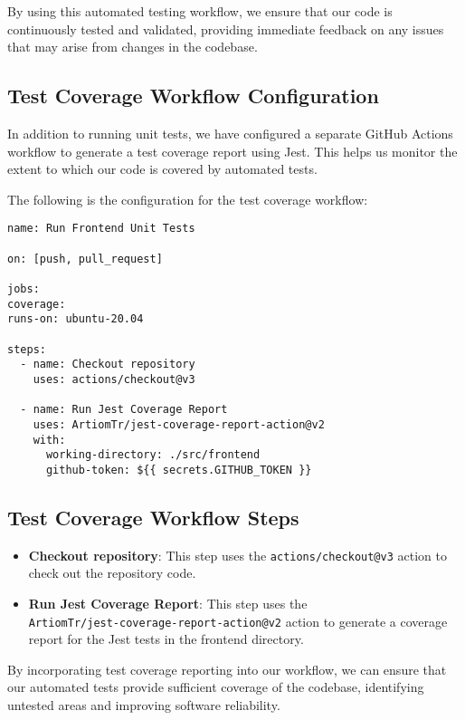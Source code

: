 \documentclass[12pt, titlepage]{article}
\begin{document}
By using this automated testing workflow, we ensure that our code is continuously tested and validated, providing immediate feedback on any issues that may arise from changes in the codebase.

\subsection{Test Coverage Workflow Configuration}

In addition to running unit tests, we have configured a separate GitHub Actions workflow to generate a test coverage report using Jest. This helps us monitor the extent to which our code is covered by automated tests.

The following is the configuration for the test coverage workflow:

\begin{verbatim}
name: Run Frontend Unit Tests

on: [push, pull_request]

jobs:
coverage:
runs-on: ubuntu-20.04

steps:
  - name: Checkout repository
    uses: actions/checkout@v3

  - name: Run Jest Coverage Report
    uses: ArtiomTr/jest-coverage-report-action@v2
    with:
      working-directory: ./src/frontend
      github-token: ${{ secrets.GITHUB_TOKEN }}

\end{verbatim}

\subsection{Test Coverage Workflow Steps}

\begin{itemize}
\item \textbf{Checkout repository}: This step uses the \texttt{actions/checkout@v3} action to check out the repository code.
\item \textbf{Run Jest Coverage Report}: This step uses the \\ \texttt{ArtiomTr/jest-coverage-report-action@v2} action to generate a coverage report for the Jest tests in the frontend directory.
\end{itemize}

By incorporating test coverage reporting into our workflow, we can ensure that our automated tests provide sufficient coverage of the codebase, identifying untested areas and improving software reliability.
		
\end{document}
